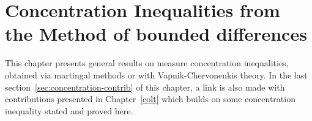 





\chapter{Concentration Inequalities from the Method of bounded differences}
\label{chap:back_concentration}
\begin{chapabstract}
This chapter presents general results on measure concentration inequalities, obtained via martingal methods or with Vapnik-Chervonenkis theory. In the last section~\ref{sec:concentration-contrib} of this chapter, a link is also made with contributions presented in Chapter~\ref{colt} which builds on some concentration inequality stated and proved here.
\end{chapabstract}

